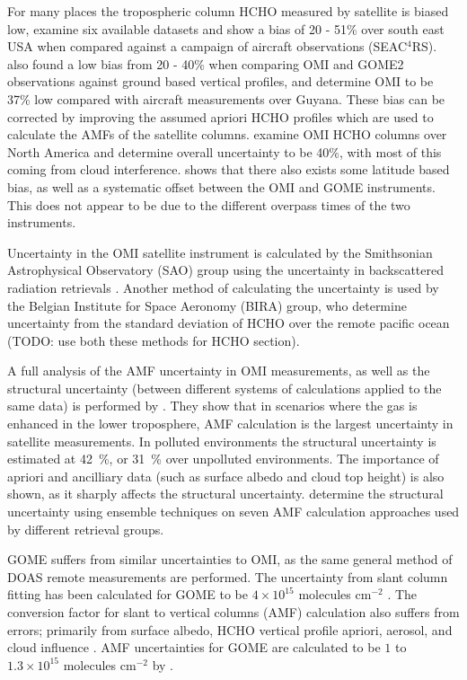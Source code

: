       For many places the tropospheric column HCHO measured by satellite is biased low, \citet{Zhu2016} examine six available datasets and show a bias of 20 - 51\% over south east USA when compared against a campaign of aircraft observations (SEAC$^4$RS).
      \citet{DeSmedt2015} also found a low bias from 20 - 40\% when comparing OMI and GOME2 observations against ground based vertical profiles, and \citet{Barkley2013} determine OMI to be 37\% low compared with aircraft measurements over Guyana.
      These bias can be corrected by improving the assumed apriori HCHO profiles which are used to calculate the AMFs of the satellite columns.
      \cite{Millet2006} examine OMI HCHO columns over North America and determine overall uncertainty to be 40\%, with most of this coming from cloud interference.
      \cite{Millet2008} shows that there also exists some latitude based bias, as well as a systematic offset between the OMI and GOME instruments.
      This does not appear to be due to the different overpass times of the two instruments.
      
      Uncertainty in the OMI satellite instrument is calculated by the Smithsonian Astrophysical Observatory (SAO) group using the uncertainty in backscattered radiation retrievals \citep{Abad2015, Abad2016}.
      Another method of calculating the uncertainty is used by the Belgian Institute for Space Aeronomy (BIRA) group, who determine uncertainty from the standard deviation of HCHO over the remote pacific ocean (TODO: use both these methods for HCHO section)\citep{DeSmedt2012, DeSmedt2015}.
      
      A full analysis of the AMF uncertainty in OMI measurements, as well as the structural uncertainty (between different systems of calculations applied to the same data) is performed by \cite{Lorente2017}.
      They show that in scenarios where the gas is enhanced in the lower troposphere, AMF calculation is the largest uncertainty in satellite measurements.
      In polluted environments the structural uncertainty is estimated at 42~\%, or 31~\% over unpolluted environments.
      The importance of apriori and ancilliary data (such as surface albedo and cloud top height) is also shown, as it sharply affects the structural uncertainty.
      \cite{Lorente2017} determine the structural uncertainty using ensemble techniques on seven AMF calculation approaches used by different retrieval groups.
      
      GOME suffers from similar uncertainties to OMI, as the same general method of DOAS remote measurements are performed.
      The uncertainty from slant column fitting has been calculated for GOME to be $4\times10^{15}$ molecules cm$^{-2}$ \citep{Chance2000, Millet2006}. 
      The conversion factor for slant to vertical columns (AMF) calculation also suffers from errors; primarily from surface albedo, HCHO vertical profile apriori, aerosol, and cloud influence \citep{Millet2006}. 
      AMF uncertainties for GOME are calculated to be $1$ to $1.3\times10^{15}$ molecules cm$^{-2}$ by \citet{Shim2005}.
    
